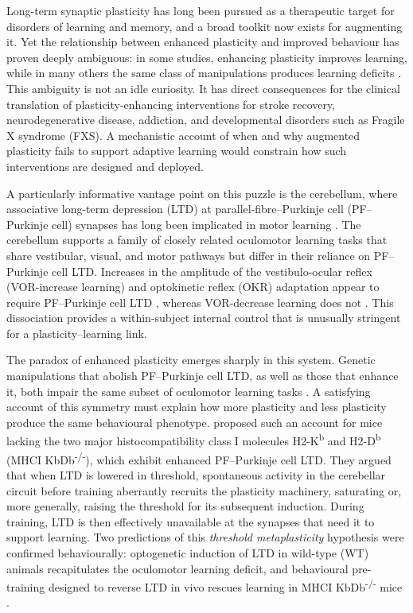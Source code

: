 \documentclass[11pt]{article}
\begin{document}
Long-term synaptic plasticity has long been pursued as a therapeutic target
for disorders of learning and memory, and a broad toolkit now exists for
augmenting it. Yet the relationship between enhanced plasticity and improved
behaviour has proven deeply ambiguous: in some studies, enhancing plasticity
improves learning, while in many others the same class of manipulations
produces learning deficits \citep{koekkoek2005fmr1, nosyreva2006fmr1,
nguyenvu2017saturation}. This ambiguity is not an idle curiosity. It has
direct consequences for the clinical translation of plasticity-enhancing
interventions for stroke recovery, neurodegenerative disease, addiction,
and developmental disorders such as Fragile X syndrome (FXS). A mechanistic
account of when and why augmented plasticity fails to support adaptive
learning would constrain how such interventions are designed and deployed.

A particularly informative vantage point on this puzzle is the cerebellum,
where associative long-term depression (LTD) at parallel-fibre--Purkinje
cell (PF--Purkinje cell) synapses has long been implicated in motor learning
\citep{boyden2004cerebellum, raymond2018cerebellum}. The cerebellum supports
a family of closely related oculomotor learning tasks that share vestibular,
visual, and motor pathways but differ in their reliance on PF--Purkinje cell
LTD. Increases in the amplitude of the vestibulo-ocular reflex (VOR-increase
learning) and optokinetic reflex (OKR) adaptation appear to require
PF--Purkinje cell LTD
\citep{boyden2004cerebellum, inoshita2018okr, takeuchi2008delphilin,
kimpo2014gating, rowan2018graded}, whereas VOR-decrease learning does not
\citep{boyden2004cerebellum, raymond2018cerebellum, kimpo2005vor,
kimpo2014gating}. This dissociation provides a within-subject internal
control that is unusually stringent for a plasticity--learning link.

The paradox of enhanced plasticity emerges sharply in this system. Genetic
manipulations that abolish PF--Purkinje cell LTD, as well as those that
enhance it, both impair the same subset of oculomotor learning tasks
\citep{nguyenvu2017saturation, koekkoek2005fmr1}. A satisfying account of
this symmetry must explain how more plasticity and less plasticity produce
the same behavioural phenotype. \citet{nguyenvu2017saturation} proposed
such an account for mice lacking the two major histocompatibility class I
molecules H2-K\textsuperscript{b} and H2-D\textsuperscript{b}
(MHCI KbDb\textsuperscript{-/-}), which exhibit enhanced PF--Purkinje cell
LTD. They argued that when LTD is lowered in threshold, spontaneous activity
in the cerebellar circuit before training aberrantly recruits the plasticity
machinery, saturating or, more generally, raising the threshold for its
subsequent induction. During training, LTD is then effectively unavailable
at the synapses that need it to support learning. Two predictions of this
\emph{threshold metaplasticity} hypothesis were confirmed behaviourally:
optogenetic induction of LTD in wild-type (WT) animals recapitulates the
oculomotor learning deficit, and behavioural pre-training designed to
reverse LTD in vivo rescues learning in MHCI KbDb\textsuperscript{-/-} mice
\citep{nguyenvu2017saturation}.
\end{document}
